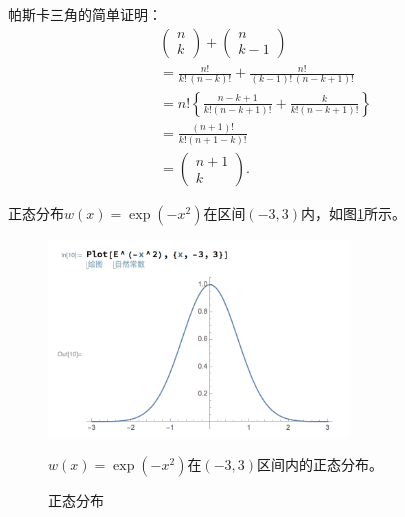 \begin{subappendices}
帕斯卡三角的简单证明：
\begin{equation*}
\begin{split}
&  \begin{pmatrix}
    n \\ k
  \end{pmatrix} +
  \begin{pmatrix}
    n \\ k-1
  \end{pmatrix} \\
  &= \frac{n!}{k! \, (n-k)!} + \frac{n!}{(k-1)! \, (n-k+1)!}\\
  &=n! \left\{ \frac{n-k+1}{k! (n-k+1)!}  + \frac{k}{k! (n-k+1)!} \right\} \\
  &= \frac{(n+1)!}{k! (n+1-k)!} \\
  &= \begin{pmatrix}
  n+1 \\ k
  \end{pmatrix}.
\end{split}
\end{equation*}

正态分布$w(x)=\exp(-x^2)$在区间$(-3,3)$内，如图\ref{fig:poly-normal-distribution-example}所示。

\begin{figure}[htbp]
   \caption{正态分布}
  \centering
  \includegraphics[width=8cm]{./Figures/20170905-normal-distri}
  \label{fig:poly-normal-distribution-example}
%

\small{$w(x) = \exp(-x^2)$在$(-3,3)$区间内的正态分布。}
\end{figure}


\end{subappendices}
